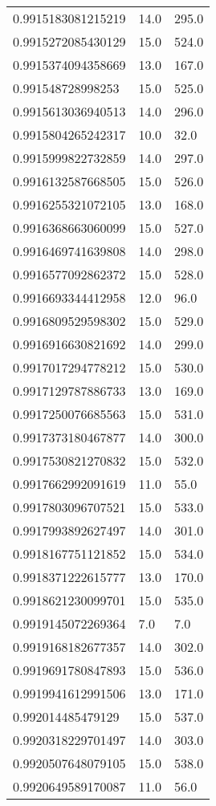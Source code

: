 \begin{center}
\begin{supertabular}[H]{p{0.30\textwidth}p{0.05\textwidth}p{0.05\textwidth}}
0.9915183081215219 & 14.0 & 295.0 \\ 
0.9915272085430129 & 15.0 & 524.0 \\ 
0.9915374094358669 & 13.0 & 167.0 \\ 
0.991548728998253 & 15.0 & 525.0 \\ 
0.9915613036940513 & 14.0 & 296.0 \\ 
0.9915804265242317 & 10.0 & 32.0 \\ 
0.9915999822732859 & 14.0 & 297.0 \\ 
0.9916132587668505 & 15.0 & 526.0 \\ 
0.9916255321072105 & 13.0 & 168.0 \\ 
0.9916368663060099 & 15.0 & 527.0 \\ 
0.9916469741639808 & 14.0 & 298.0 \\ 
0.9916577092862372 & 15.0 & 528.0 \\ 
0.9916693344412958 & 12.0 & 96.0 \\ 
0.9916809529598302 & 15.0 & 529.0 \\ 
0.9916916630821692 & 14.0 & 299.0 \\ 
0.9917017294778212 & 15.0 & 530.0 \\ 
0.9917129787886733 & 13.0 & 169.0 \\ 
0.9917250076685563 & 15.0 & 531.0 \\ 
0.9917373180467877 & 14.0 & 300.0 \\ 
0.9917530821270832 & 15.0 & 532.0 \\ 
0.9917662992091619 & 11.0 & 55.0 \\ 
0.9917803096707521 & 15.0 & 533.0 \\ 
0.9917993892627497 & 14.0 & 301.0 \\ 
0.9918167751121852 & 15.0 & 534.0 \\ 
0.9918371222615777 & 13.0 & 170.0 \\ 
0.9918621230099701 & 15.0 & 535.0 \\ 
0.9919145072269364 & 7.0 & 7.0 \\ 
0.9919168182677357 & 14.0 & 302.0 \\ 
0.9919691780847893 & 15.0 & 536.0 \\ 
0.9919941612991506 & 13.0 & 171.0 \\ 
0.992014485479129 & 15.0 & 537.0 \\ 
0.9920318229701497 & 14.0 & 303.0 \\ 
0.9920507648079105 & 15.0 & 538.0 \\ 
0.9920649589170087 & 11.0 & 56.0 \\ 

\end{supertabular}
\end{center}
